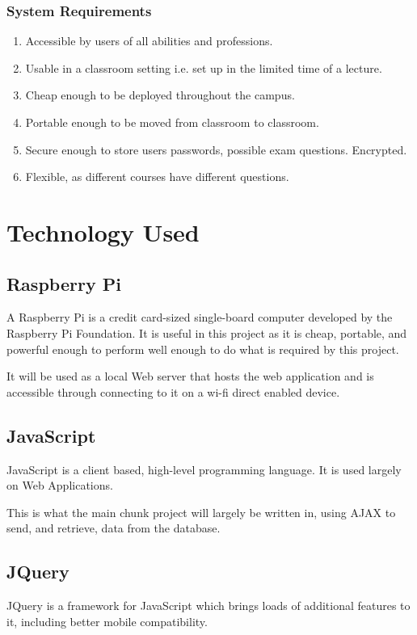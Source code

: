 \documentclass{article}
\begin{document}
\subsubsection{System Requirements}
\begin{enumerate}
	\item Accessible by users of all abilities and professions.
	\item Usable in a classroom setting i.e. set up in the limited time of a lecture.
	\item Cheap enough to be deployed throughout the campus.
	\item Portable enough to be moved from classroom to classroom.
	\item Secure enough to store users passwords, possible exam questions. Encrypted.
	\item Flexible, as different courses have different questions.
\end{enumerate}
\section{Technology Used}
\subsection{Raspberry Pi}
A Raspberry Pi is a credit card-sized single-board computer developed by the Raspberry Pi Foundation. It is useful in this project as it is cheap, portable, and powerful enough to perform well enough to do what is required by this project. 

It will be used as a local Web server that hosts the web application and is accessible through connecting to it on a wi-fi direct enabled device.

\subsection{JavaScript}
JavaScript is a client based, high-level programming language. It is used largely on Web Applications. 

This is what the main chunk project will largely be written in, using AJAX to send, and retrieve, data from the database.

\subsection{JQuery}
JQuery is a framework for JavaScript which brings loads of additional features to it, including better mobile compatibility. 
\end{document}
